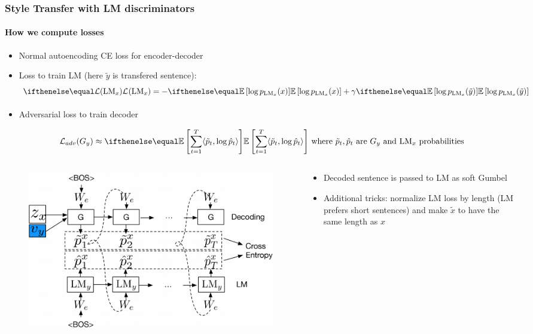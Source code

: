 \documentclass[10pt]{beamer}
\begin{document}
\begin{frame}
\frametitle{Style Transfer with LM discriminators}
\framesubtitle{How we compute losses}
\begin{itemize}
\item Normal autoencoding CE loss for encoder-decoder
\item Loss to train LM (here $\tilde{y}$ is transfered sentence):
\[
\loss{\text{LM}_x} = -\expect{\log p_{\text{LM}_x}(x)} + \gamma \expect{\log p_{\text{LM}_x}(\tilde{y})}
\]
\end{itemize}
\begin{itemize}
\item Adversarial loss to train decoder
\end{itemize}
\[
\mathcal{L}_{adv}(G_y) \approx \expect{\sum_{t=1}^T \langle \tilde{p}_t, \log \hat{p}_t \rangle} \text{ where } \tilde{p}_t, \hat{p}_t \text{ are } G_y \text{ and } \text{LM}_x \text{ probabilities}
\]

\begin{columns}
\begin{column}{6cm}
\begin{figure}
\centering
\includegraphics[width=\textwidth]{images/style-transfer-with-lm-discriminators-soft-embed}
\end{figure}    
\end{column}

\begin{column}{6cm}
\begin{itemize}
    \item Decoded sentence is passed to LM as soft Gumbel
    \item Additional tricks: normalize LM loss by length (LM prefers short sentences) and make $\tilde{x}$ to have the same length as $x$ 
\end{itemize}
\end{column}
\end{columns}
\end{frame}
\end{document}

